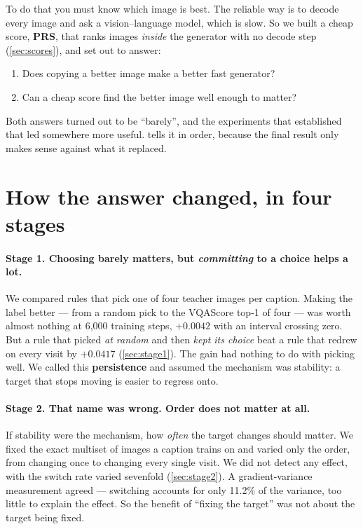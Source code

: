 \documentclass[11pt]{article}
\newcommand{\obs}[1]{\textcolor{obsblue}{#1}}
\begin{document}
To do that you must know which image is best. The reliable way is to decode every image and ask a
vision--language model, which is slow. So we built a cheap score, \textbf{PRS}, that ranks images
\emph{inside} the generator with no decode step (\cref{sec:scores}), and set out to answer:

\begin{enumerate}[nosep]
  \item Does copying a better image make a better fast generator?
  \item Can a cheap score find the better image well enough to matter?
\end{enumerate}

Both answers turned out to be ``barely'', and the experiments that established that led somewhere
more useful.  tells it in order, because the final result only makes sense against
what it replaced.

\section{How the answer changed, in four stages}
\label{sec:story}

\paragraph{Stage 1. Choosing barely matters, but \emph{committing} to a choice helps a lot.}
We compared rules that pick one of four teacher images per caption. Making the label better --- from
a random pick to the VQAScore top-1 of four --- was worth almost nothing at \obs{6{,}000} training steps,
\obs{$+0.0042$} with an interval crossing zero. But a rule that picked \emph{at random} and then
\emph{kept its choice} beat a rule that redrew on every visit by \obs{$+0.0417$}
(\cref{sec:stage1}). The gain had nothing to do with picking well. We called this
\textbf{persistence} and assumed the mechanism was stability: a target that stops moving is easier
to regress onto.

\paragraph{Stage 2. That name was wrong. Order does not matter at all.}
If stability were the mechanism, how \emph{often} the target changes should matter. We fixed the
exact multiset of images a caption trains on and varied only the order, from changing once to
changing every single visit. We did not detect any effect, with the switch rate varied sevenfold
(\cref{sec:stage2}). A gradient-variance measurement agreed --- switching accounts for only
\obs{11.2\%} of the variance, too little to explain the effect. So the benefit of ``fixing the
target'' was not about the target being fixed.
\end{document}
